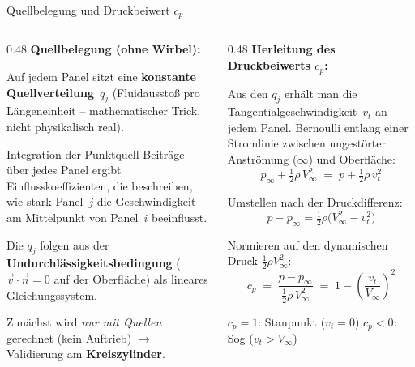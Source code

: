 \documentclass[aspectratio=169]{beamer}
\begin{document}
\begin{frame}{Quellbelegung und Druckbeiwert $c_p$}
\footnotesize

\begin{columns}[T]
\begin{column}{0.48\textwidth}
\textbf{Quellbelegung (ohne Wirbel):}

\smallskip
Auf jedem Panel sitzt eine \textbf{konstante Quellverteilung}~$q_j$
(Fluidausstoß pro Längeneinheit -- mathematischer Trick,
nicht physikalisch real).

\smallskip
Integration der Punktquell-Beiträge über jedes Panel ergibt
Einflusskoeffizienten, die beschreiben, wie stark Panel~$j$
die Geschwindigkeit am Mittelpunkt von Panel~$i$ beeinflusst.

\smallskip
Die $q_j$ folgen aus der \textbf{Undurchlässigkeitsbedingung}
($\vec{v}\!\cdot\!\vec{n}=0$ auf der Oberfläche) als lineares
Gleichungssystem.

\smallskip
Zunächst wird \emph{nur mit Quellen} gerechnet
(kein Auftrieb) $\to$ Validierung am \textbf{Kreiszylinder}.
\end{column}
\begin{column}{0.48\textwidth}
\textbf{Herleitung des Druckbeiwerts $c_p$:}

\smallskip
Aus den $q_j$ erhält man die Tangentialgeschwindigkeit~$v_t$
an jedem Panel. Bernoulli entlang einer Stromlinie zwischen
ungestörter Anströmung ($\infty$) und Oberfläche:
\[
  p_\infty + \tfrac{1}{2}\rho\, V_\infty^2
  \;=\;
  p + \tfrac{1}{2}\rho\, v_t^2
\]

\vspace{-3mm}
Umstellen nach der Druckdifferenz:
\[
  p - p_\infty = \tfrac{1}{2}\rho\bigl(V_\infty^2 - v_t^2\bigr)
\]

\vspace{-3mm}
Normieren auf den dynamischen Druck $\tfrac{1}{2}\rho V_\infty^2$:
\[
  \boxed{c_p \;=\; \frac{p - p_\infty}{\tfrac{1}{2}\rho\,V_\infty^2}
  \;=\; 1 - \left(\frac{v_t}{V_\infty}\right)^{\!2}}
\]

\vspace{-3mm}
$c_p=1$: Staupunkt ($v_t\!=\!0$) \quad $c_p<0$: Sog ($v_t\!>\!V_\infty$)
\end{column}
\end{columns}

\end{frame}
\end{document}
